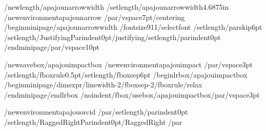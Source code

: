 /newlength{/apajounarrowwidth}
/setlength{/apajounarrowwidth}{4.6875in}
/newenvironment{apajounarrow}
  {/par/vspace{7pt}/centering
   /begin{minipage}{/apajounarrowwidth}%
   /fontsize{9}{11}/selectfont
   /setlength{/parskip}{6pt}%
   /setlength{/JustifyingParindent}{0pt}/justifying/setlength{/parindent}{0pt}}
  {/end{minipage}/par/vspace{10pt}}

/newsavebox{/apajouimpactbox}
/newenvironment{apajouimpact}
  {/par/vspace{3pt}%
   /setlength{/fboxrule}{0.5pt}/setlength{/fboxsep}{6pt}%
   /begin{lrbox}{/apajouimpactbox}%
   /begin{minipage}{/dimexpr/linewidth-2/fboxsep-2/fboxrule/relax}}
  {/end{minipage}/end{lrbox}%
   /noindent/fbox{/usebox{/apajouimpactbox}}/par/vspace{3pt}}

/newenvironment{apajouorcid}
  {/par/setlength{/parindent}{0pt}%
   /setlength{/RaggedRightParindent}{0pt}/RaggedRight}
  {/par}

